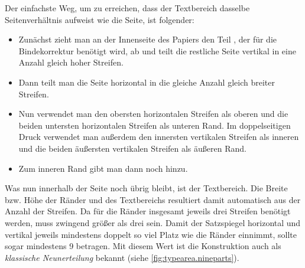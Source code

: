 \begin{Explain}
  Der einfachste Weg, um zu erreichen, dass der Textbereich dasselbe
  Seitenverhältnis aufweist wie die Seite, ist folgender:%
  \begin{itemize}
  \item Zunächst zieht man an der Innenseite des Papiers den Teil
    , der für die
    Bindekorrektur benötigt wird, ab und teilt die
    restliche Seite vertikal in eine Anzahl  gleich hoher Streifen.
  \item Dann teilt man die Seite horizontal in die gleiche Anzahl
     gleich breiter Streifen.
  \item Nun verwendet man den obersten horizontalen Streifen als oberen und
    die beiden untersten horizontalen Streifen als unteren Rand. Im
    doppelseitigen Druck verwendet man außerdem den innersten vertikalen
    Streifen als inneren und die beiden äußersten vertikalen Streifen als
    äußeren Rand.
  \item Zum inneren Rand gibt man dann noch  hinzu.
  \end{itemize}
  Was nun innerhalb der Seite noch übrig bleibt, ist der
  Textbereich. Die Breite bzw. Höhe der Ränder und des
  Textbereichs resultiert damit automatisch aus der Anzahl  der
  Streifen. Da für die Ränder insgesamt jeweils drei Streifen benötigt werden,
  muss  zwingend größer als drei sein. Damit der Satzspiegel
  horizontal und vertikal jeweils mindestens doppelt so viel Platz wie die
  Ränder einnimmt, sollte  sogar mindestens 9 betragen. Mit diesem
  Wert ist die Konstruktion auch als \emph{klassische Neunerteilung} bekannt
  (siehe \autoref{fig:typearea.nineparts}).


\end{Explain}

